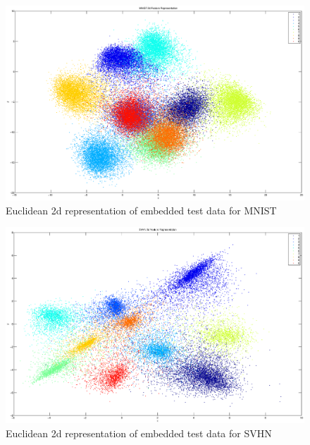 \documentclass{article} %
\begin{document}
\begin{figure}[h]
\begin{center}
\includegraphics[width=1\linewidth]{mnist-rep.eps}
\end{center}
   \caption{Euclidean 2d representation of embedded test data for MNIST}\label{TripletRepMNIST}
\end{figure}
\begin{figure}[h]
\begin{center}
\includegraphics[width=1\linewidth]{svhn-rep.eps}
\end{center}
   \caption{Euclidean 2d representation of embedded test data for SVHN}\label{TripletRepSVHN}
\end{figure}
\end{document}
